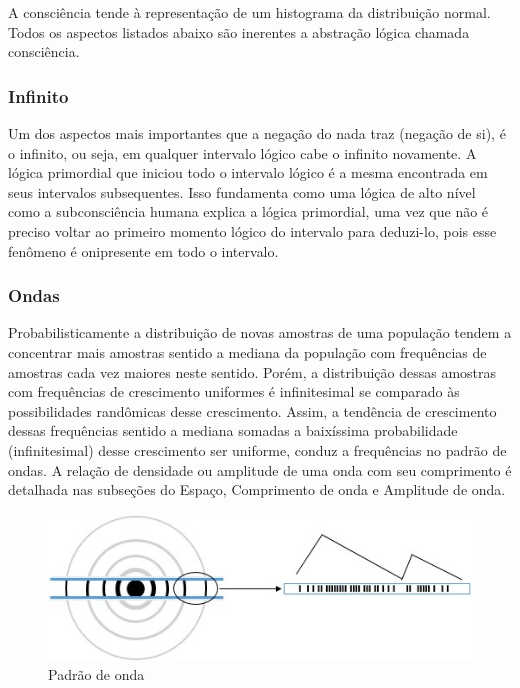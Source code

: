 A consciência tende à representação de um histograma da distribuição normal. Todos os aspectos listados abaixo são inerentes a abstração lógica chamada consciência.

\subsubsection{Infinito}
Um dos aspectos mais importantes que a negação do nada traz (negação de si), é o infinito, ou seja, em qualquer intervalo lógico cabe o infinito novamente. A lógica primordial que iniciou todo o intervalo lógico é a mesma encontrada em seus intervalos subsequentes. Isso fundamenta como uma lógica de alto nível como a subconsciência humana explica a lógica primordial, uma vez que não é preciso voltar ao primeiro momento lógico do intervalo para deduzi-lo, pois esse fenômeno é onipresente em todo o intervalo.

\subsubsection{Ondas}
Probabilisticamente a distribuição de novas amostras de uma população tendem a concentrar mais amostras sentido a mediana da população com frequências de amostras cada vez maiores neste sentido. Porém, a distribuição dessas amostras com frequências de crescimento uniformes é infinitesimal se comparado às possibilidades randômicas desse crescimento. Assim, a tendência de crescimento dessas frequências sentido a mediana somadas a baixíssima probabilidade (infinitesimal) desse crescimento ser uniforme, conduz a frequências no padrão de ondas. A relação de densidade ou amplitude de uma onda com seu comprimento é detalhada nas subseções do Espaço, Comprimento de onda e Amplitude de onda.
	\begin{figure}[H]
	\caption{Padrão de onda}
	\label{fig:consciousness_waves}
	\centering
	\includegraphics[scale=1]{sections/images/consciousness_waves.jpg}
	\end{figure}

